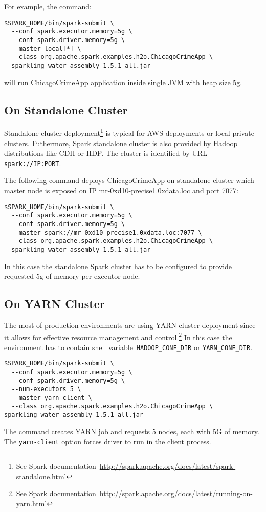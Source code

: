 For example, the command:
\begin{verbatim}
$SPARK_HOME/bin/spark-submit \ 
  --conf spark.executor.memory=5g \
  --conf spark.driver.memory=5g \
  --master local[*] \
  --class org.apache.spark.examples.h2o.ChicagoCrimeApp \
  sparkling-water-assembly-1.5.1-all.jar  
\end{verbatim}
will run ChicagoCrimeApp application inside single JVM with heap size 5g.

\subsection{On Standalone Cluster}
Standalone cluster deployment\footnote{See Spark documentation~\url{http://spark.apache.org/docs/latest/spark-standalone.html}} is typical for AWS deployments or local private clusters. Futhermore, Spark standalone cluster is also provided by Hadoop distributions like CDH or HDP. The cluster is identified by URL \texttt{spark://IP:PORT}.

The following command deploys ChicagoCrimeApp on standalone cluster which master node is exposed on IP mr-0xd10-precise1.0xdata.loc and port 7077:

\begin{verbatim}
$SPARK_HOME/bin/spark-submit \ 
  --conf spark.executor.memory=5g \
  --conf spark.driver.memory=5g \
  --master spark://mr-0xd10-precise1.0xdata.loc:7077 \
  --class org.apache.spark.examples.h2o.ChicagoCrimeApp \
  sparkling-water-assembly-1.5.1-all.jar  
\end{verbatim}

In this case the standalone Spark cluster has to be configured to provide requested 5g of memory per executor node. 

\subsection{On YARN Cluster}
The most of production environments are using YARN cluster deployment since it allows for effective resource management and control.\footnote{See Spark documentation~\url{http://spark.apache.org/docs/latest/running-on-yarn.html}} 
In this case the environment has to contain shell variable~\texttt{HADOOP\_CONF\_DIR} or \texttt{YARN\_CONF\_DIR}.

\begin{verbatim}
$SPARK_HOME/bin/spark-submit \ 
  --conf spark.executor.memory=5g \
  --conf spark.driver.memory=5g \
  --num-executors 5 \
  --master yarn-client \
  --class org.apache.spark.examples.h2o.ChicagoCrimeApp \
sparkling-water-assembly-1.5.1-all.jar  
\end{verbatim}

The command creates YARN job and requests 5 nodes, each with 5G of memory. The \texttt{yarn-client} option forces driver to run in the client process.

